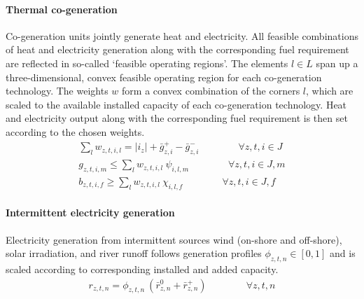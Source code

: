 \documentclass[11pt,a4paper]{article}
\begin{document}
\paragraph{Thermal co-generation}
Co-generation units jointly generate heat and electricity. All feasible combinations of heat and electricity generation along with the corresponding fuel requirement are reflected in so-called `feasible operating regions'. 
The elements $l \in L$ span up a three-dimensional, convex feasible operating region for each co-generation technology. 
The weights $w$ form a convex combination of the corners $l$, which are scaled to the available installed capacity of each co-generation technology.
Heat and electricity output along with the corresponding fuel requirement is then set according to the chosen weights.
\begin{align}
\sum_{l} w_{z,t,i,l} = |i_{z}| + \bar{g}^{+}_{z,i} - \bar{g}^{-}_{z,i} \qquad \qquad \forall z,t,i \in J \\
g_{z,t,i,m} \leq \sum_{l} w_{z,t,i,l} \: \psi_{i,l,m} \qquad \qquad \forall z,t,i \in J, m \\
b_{z,t,i,f} \geq \sum_{l} w_{z,t,i,l} \: \chi_{i,l,f} \qquad \qquad \forall z,t,i \in J, f
\end{align}

\paragraph{Intermittent electricity generation}
Electricity generation from intermittent sources wind (on-shore and off-shore), solar irradiation, and river runoff follows generation profiles $\phi_{z,t,n} \in [0,1]$ and is scaled according to corresponding installed and added capacity.
\begin{align}
r_{z,t,n} = \phi_{z,t,n} \: \left( \bar{r}^{0}_{z,n} + \bar{r}^{+}_{z,n} \right) \qquad \qquad \forall z,t,n
\end{align}
\end{document}
